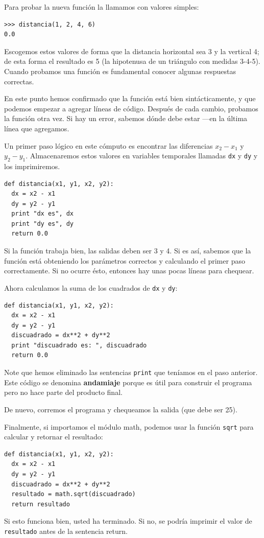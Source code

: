 Para probar la nueva función la llamamos con valores simples:

\beforeverb
\begin{verbatim}
>>> distancia(1, 2, 4, 6)
0.0
\end{verbatim}
\afterverb
%
Escogemos estos valores de forma que la distancia horizontal sea 3
y la vertical 4; de esta forma el resultado es 5 (la hipotenusa
de un triángulo con medidas 3-4-5). Cuando probamos una función
es fundamental conocer algunas respuestas correctas.

En este punto hemos confirmado que la función está bien sintácticamente,
y que podemos empezar a agregar líneas de código. Después de cada
cambio, probamos la función otra vez. Si hay un error, sabemos
dónde debe estar ---en la última línea que agregamos.

Un primer paso lógico en este cómputo es encontrar las diferencias
$x_2 - x_1$ y $y_2 - y_1$.  Almacenaremos estos valores en
variables temporales llamadas \texttt{dx} y \texttt{dy} y los imprimiremos.

\beforeverb
\begin{verbatim}
def distancia(x1, y1, x2, y2):
  dx = x2 - x1
  dy = y2 - y1
  print "dx es", dx
  print "dy es", dy
  return 0.0
\end{verbatim}
\afterverb
%
Si la función trabaja bien, las salidas deben ser 3 y 4. Si es así,
sabemos que la función está obteniendo los parámetros correctos y
calculando el primer paso correctamente. Si no ocurre ésto, entonces
hay unas pocas líneas para chequear.

Ahora calculamos la suma de los cuadrados de \texttt{dx} y \texttt{dy}:

\beforeverb
\begin{verbatim}
def distancia(x1, y1, x2, y2):
  dx = x2 - x1
  dy = y2 - y1
  discuadrado = dx**2 + dy**2
  print "discuadrado es: ", discuadrado
  return 0.0
\end{verbatim}
\afterverb
%
Note que hemos eliminado las sentencias \texttt{print} que teníamos en el paso
anterior. Este código se denomina {\bf andamiaje} porque es útil para
construir el programa pero no hace parte del producto final.

De nuevo, corremos el programa y chequeamos la salida (que debe ser 25).

Finalmente, si importamos el módulo math, podemos usar la función
\texttt{sqrt} para calcular y retornar el resultado:

\beforeverb
\begin{verbatim}
def distancia(x1, y1, x2, y2):
  dx = x2 - x1
  dy = y2 - y1
  discuadrado = dx**2 + dy**2
  resultado = math.sqrt(discuadrado)
  return resultado
\end{verbatim}
\afterverb
%
Si esto funciona bien, usted ha terminado.  Si no, se podría
imprimir el valor de  \texttt{resultado} antes de la sentencia return.

